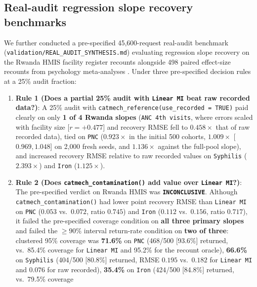 \documentclass[
]{article}
\providecommand{\tightlist}{%
  \setlength{\itemsep}{0pt}\setlength{\parskip}{0pt}}
\begin{document}
\subsection{Real-audit regression slope recovery
benchmarks}\label{real-audit-regression-slope-recovery-benchmarks}

We further conducted a pre-specified 45,600-request real-audit benchmark
(\texttt{validation/REAL\_AUDIT\_SYNTHESIS.md}) evaluating regression
slope recovery on the Rwanda HMIS facility register recounts
\citep{nshimyiryo2020health} alongside 498 paired effect-size recounts
from psychology meta-analyses \citep{maassen2020reproducibility}. Under
three pre-specified decision rules at a 25\% audit fraction:

\begin{enumerate}
\def\labelenumi{\arabic{enumi}.}
\tightlist
\item
  \textbf{Rule 1 (Does a partial 25\% audit with \texttt{Linear\ MI}
  beat raw recorded data?)}: A 25\% audit with
  \texttt{catmech\_reference(use\_recorded\ =\ TRUE)} paid clearly on
  only \textbf{1 of 4 Rwanda slopes} (\texttt{ANC\ 4th\ visits}, where
  errors scaled with facility size {[}\(r = +0.477\){]} and recovery
  RMSE fell to \(0.458\times\) that of raw recorded data), tied on
  \texttt{PNC} (\(0.923\times\) in the initial 500 cohorts,
  \(1.009\times\) {[}\(0.969, 1.048\){]} on 2,000 fresh seeds, and
  \(1.136\times\) against the full-pool slope), and increased recovery
  RMSE relative to raw recorded values on \texttt{Syphilis}
  (\(2.393\times\)) and \texttt{Iron} (\(1.125\times\)).
\item
  \textbf{Rule 2 (Does \texttt{catmech\_contamination()} add value over
  \texttt{Linear\ MI}?)}: The pre-specified verdict on Rwanda HMIS was
  \textbf{\texttt{INCONCLUSIVE}}. Although
  \texttt{catmech\_contamination()} had lower point recovery RMSE than
  \texttt{Linear\ MI} on \texttt{PNC} (\(0.053\) vs.~\(0.072\), ratio
  \(0.745\)) and \texttt{Iron} (\(0.112\) vs.~\(0.156\), ratio
  \(0.717\)), it failed the pre-specified coverage condition on
  \textbf{all three primary slopes} and failed the \(\ge 90\%\) interval
  return-rate condition on \textbf{two of three}: clustered 95\%
  coverage was \textbf{71.6\%} on \texttt{PNC} (468/500 {[}93.6\%{]}
  returned, vs.~85.4\% coverage for \texttt{Linear\ MI} and 95.2\% for
  the recount oracle), \textbf{66.6\%} on \texttt{Syphilis} (404/500
  {[}80.8\%{]} returned, RMSE \(0.195\) vs.~\(0.182\) for
  \texttt{Linear\ MI} and \(0.076\) for raw recorded), \textbf{35.4\%}
  on \texttt{Iron} (424/500 {[}84.8\%{]} returned, vs.~79.5\% coverage

\end{enumerate}
\end{document}
